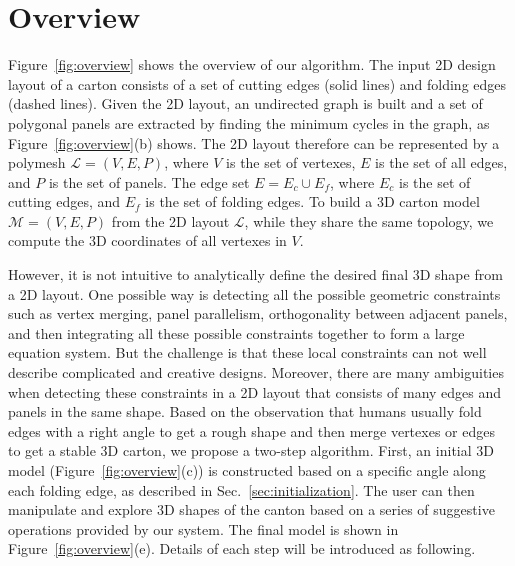 \section{Overview}\label{sec:overview}


Figure~\ref{fig:overview} shows the overview of our algorithm. 
The input 2D design layout of a carton consists of a set of cutting edges (solid lines) and folding edges (dashed lines).
%
Given the 2D layout, an undirected graph is built and a set of polygonal panels are extracted by finding the minimum cycles in the graph, as Figure~\ref{fig:overview}(b) shows. 
The 2D layout therefore can be represented by a polymesh $\mathcal{L}=(V,E,P)$, where $V$ is the set of vertexes, $E$ is the set of all edges, and $P$ is the set of panels. 
The edge set $E=E_c\cup E_f$, where $E_c$ is the set of cutting edges, and $E_f$ is the set of folding edges.
%
To build a 3D carton model $\mathcal{M}=(V, E, P)$ from the 2D layout $\mathcal{L}$, while they share the same topology, we compute the 3D coordinates of all vertexes in $V$. 
%

However, it is not intuitive to analytically define the desired final 3D shape from a 2D layout. 
One possible way is detecting all the possible geometric constraints such as vertex merging, panel parallelism, orthogonality between adjacent panels, and then integrating all these possible constraints together to form a large equation system. 
But the challenge is that these local constraints can not well describe complicated and creative designs. 
Moreover, there are many ambiguities when detecting these constraints in a 2D layout that consists of many edges and panels in the same shape. 
%
Based on the observation that humans usually fold edges with a right angle to get a rough shape and then merge vertexes or edges to get a stable 3D carton, we propose a two-step algorithm. 
First, an initial 3D model (Figure~\ref{fig:overview}(c)) is constructed based on a specific angle along each folding edge, as described in Sec.~\ref{sec:initialization}.
The user can then manipulate and explore 3D shapes of the canton based on a series of suggestive operations provided by our system. 
%
The final model is shown in Figure~\ref{fig:overview}(e).
Details of each step will be introduced as following. 


